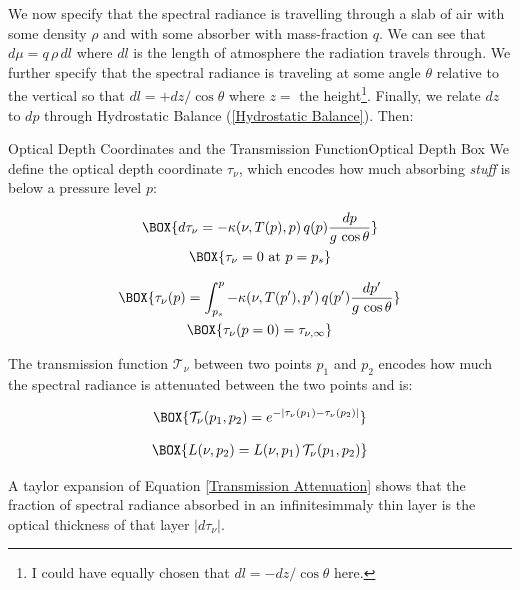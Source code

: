 We now specify that the spectral radiance is travelling through a slab of air with some density $\rho$ and with some absorber with mass-fraction $q$. We can see that $d\mu=q\,\rho\,dl$ where $dl$ is the length of atmosphere the radiation travels through. We further specify that the spectral radiance is traveling at some angle $\theta$ relative to the vertical so that $dl=+dz/\cos\theta$ where $z=$ the height\footnote{I could have equally chosen that $dl=-dz/\cos\theta$ here.}. Finally, we relate $dz$ to $dp$ through Hydrostatic Balance (\ref{Hydrostatic Balance}). Then:
\begin{fact}{Optical Depth Coordinates and the Transmission Function}{Optical Depth Box}\label{Optical Depth Box}
    We define the optical depth coordinate $\tau_\nu$, which encodes how much absorbing \textit{stuff} is below a pressure level $p$:

    \begin{minipage}{.5\linewidth}
        \begin{gather}
            \label{Optical Pressure}
            \BOX{d\tau_\nu=-\kappa(\nu,T(p),p)\,q(p)\frac{dp}{g\,\cos\theta}}\\
            \BOX{\tau_\nu=0\text{  at  }p=p_s}
        \end{gather}
    \end{minipage}
    \begin{minipage}{.5\linewidth}
        \begin{gather}
            \BOX{\tau_\nu(p)=\int_{p_s}^p-\kappa(\nu,T(p'),p')\,q(p')\frac{dp'}{g\,\cos\theta}}\\
            \BOX{\tau_\nu(p=0)=\tau_{\nu,\infty}}
        \end{gather}
    \end{minipage}
    The transmission function $\mathcal{T}_\nu$ between two points $p_1$ and $p_2$ encodes how much the spectral radiance is attenuated between the two points and is:

    \begin{minipage}{.5\linewidth}
        \begin{align}
            \BOX{
                \mathcal{T}_\nu(p_1,p_2)=e^{-|\tau_\nu(p_1)-\tau_\nu(p_2)|}
            }
        \end{align}
    \end{minipage}
    \begin{minipage}{.5\linewidth}
        \begin{align}
            \label{Transmission Attenuation}
            \BOX{
                L(\nu,p_2)=L(\nu,p_1)\,\mathcal{T}_\nu(p_1,p_2)
            }
        \end{align}
    \end{minipage}

    A taylor expansion of Equation \ref{Transmission Attenuation} shows that the fraction of spectral radiance absorbed in an infinitesimmaly thin layer is the optical thickness of that layer $|d\tau_\nu|$.
\end{fact}

